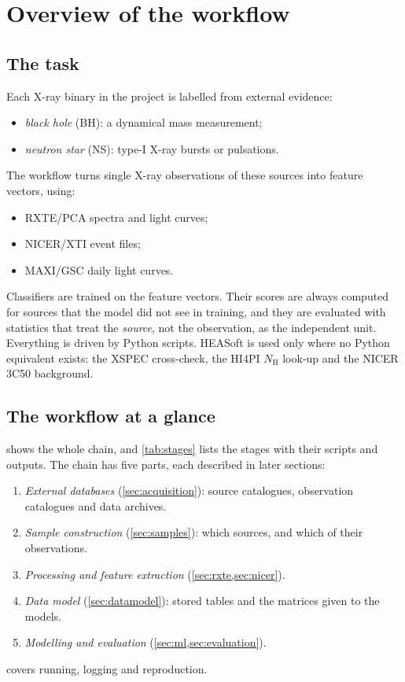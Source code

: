 \section{Overview of the workflow}\label{sec:overview}

\subsection{The task}
Each X-ray binary in the project is labelled from external evidence:
\begin{itemize}
\item \emph{black hole} (BH): a dynamical mass measurement;
\item \emph{neutron star} (NS): type-I X-ray bursts or pulsations.
\end{itemize}
The workflow turns single X-ray observations of these sources into feature vectors, using:
\begin{itemize}
\item RXTE/PCA spectra and light curves;
\item NICER/XTI event files;
\item MAXI/GSC daily light curves.
\end{itemize}
Classifiers are trained on the feature vectors. Their scores are always computed for sources that the model did not see
in training, and they are evaluated with statistics that treat the \emph{source}, not the observation, as the independent
unit. Everything is driven by Python scripts. HEASoft is used only where no Python equivalent exists: the XSPEC
cross-check, the HI4PI $N_\mathrm{H}$ look-up and the NICER 3C50 background.

\subsection{The workflow at a glance}
 shows the whole chain, and \cref{tab:stages} lists the stages with their scripts and outputs. The
chain has five parts, each described in later sections:
\begin{enumerate}
\item \emph{External databases} (\cref{sec:acquisition}): source catalogues, observation catalogues and data archives.
\item \emph{Sample construction} (\cref{sec:samples}): which sources, and which of their observations.
\item \emph{Processing and feature extraction} (\cref{sec:rxte,sec:nicer}).
\item \emph{Data model} (\cref{sec:datamodel}): stored tables and the matrices given to the models.
\item \emph{Modelling and evaluation} (\cref{sec:ml,sec:evaluation}).
\end{enumerate}
 covers running, logging and reproduction.

